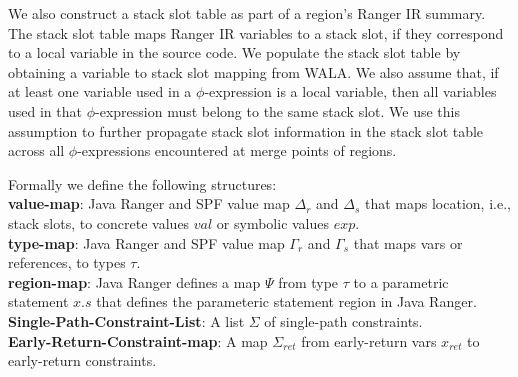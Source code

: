 We also construct a stack slot table as part of a region\rq s Ranger IR summary.
%
The stack slot table maps Ranger IR variables to a stack slot, if they correspond to a local variable in the source code.
%
We populate the stack slot table by obtaining a variable to stack slot mapping from WALA.
%
We also assume that, if at least one variable used in a $\phi$-expression is a local variable, then all variables
used in that $\phi$-expression must belong to the same stack slot.
%
We use this assumption to further propagate stack slot information in the stack slot table across all $\phi$-expressions
encountered at merge points of regions.


Formally we define the following structures: \\
\textbf{value-map}: Java Ranger and SPF value map $\Delta_r$ and $\Delta_s$  that maps location, i.e., stack slots, to concrete values $val$ or symbolic values $exp$. \\
\textbf{type-map}: Java Ranger and SPF value map $\Gamma_r$ and $\Gamma_s$  that maps vars or references, to types $\tau$.\\
\textbf{region-map}: Java Ranger defines a map $\Psi$ from type $\tau$  to a parametric statement $x.s$ that defines the parameteric statement region in Java Ranger.\\
\textbf{Single-Path-Constraint-List}: A list $\Sigma$ of single-path constraints.\\
\textbf{Early-Return-Constraint-map}: A map $\Sigma_{ret}$ from early-return vars $x_{ret}$ to early-return constraints.



